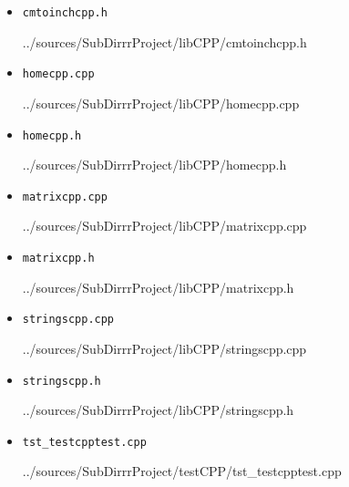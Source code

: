 \documentclass[12pt,a4paper]{report}
\begin{document}
\begin{itemize}
\item[] \verb-cmtoinchcpp.h-

{../sources/SubDirrrProject/libCPP/cmtoinchcpp.h}

\item[] \verb-homecpp.cpp-

{../sources/SubDirrrProject/libCPP/homecpp.cpp}

\item[] \verb-homecpp.h-

{../sources/SubDirrrProject/libCPP/homecpp.h}

\item[] \verb-matrixcpp.cpp-

{../sources/SubDirrrProject/libCPP/matrixcpp.cpp}

\item[] \verb-matrixcpp.h-

{../sources/SubDirrrProject/libCPP/matrixcpp.h}

\item[] \verb-stringscpp.cpp-

{../sources/SubDirrrProject/libCPP/stringscpp.cpp}

\item[] \verb-stringscpp.h-

{../sources/SubDirrrProject/libCPP/stringscpp.h}

\item[] \verb-tst_testcpptest.cpp-

{../sources/SubDirrrProject/testCPP/tst_testcpptest.cpp}

\end{itemize}
\end{document}
